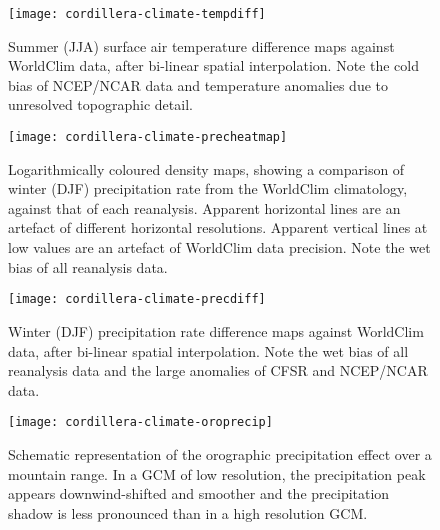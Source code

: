 \begin{figure}[t]
	\vspace*{2mm}
	\begin{center}
		\texttt{[image: cordillera-climate-tempdiff]}
	\end{center}
	\caption{Summer (JJA) surface air temperature difference maps against WorldClim data, after bi-linear spatial interpolation. Note the cold bias of NCEP/NCAR data and temperature anomalies due to unresolved topographic detail.}
	\label{fig:tempdiff}
\end{figure}

\begin{figure}[t]
	\vspace*{2mm}
	\begin{center}
		\texttt{[image: cordillera-climate-precheatmap]}
	\end{center}
	\caption{Logarithmically coloured density maps, showing a comparison of winter (DJF) precipitation rate from the WorldClim climatology, against that of each reanalysis. Apparent horizontal lines are an artefact of different horizontal resolutions. Apparent vertical lines at low values are an artefact of WorldClim data precision. Note the wet bias of all reanalysis data.}
	\label{fig:precheatmap}
\end{figure}

\begin{figure}[t]
	\vspace*{2mm}
	\begin{center}
		\texttt{[image: cordillera-climate-precdiff]}
	\end{center}
	\caption{Winter (DJF) precipitation rate difference maps against WorldClim data, after bi-linear spatial interpolation. Note the wet bias of all reanalysis data and the large anomalies of CFSR and NCEP/NCAR data.}
	\label{fig:precdiff}
\end{figure}

\begin{figure}[t]
	\vspace*{2mm}
	\begin{center}
		\texttt{[image: cordillera-climate-oroprecip]}
	\end{center}
	\caption{Schematic representation of the orographic precipitation effect over a mountain range. In a GCM of low resolution, the precipitation peak appears downwind-shifted and smoother and the precipitation shadow is less pronounced than in a high resolution GCM.}
	\label{fig:oroprecip}
\end{figure}

